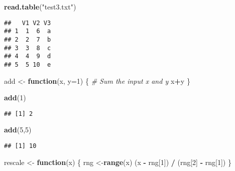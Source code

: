 \documentclass[]{article}
\newenvironment{Shaded}{\begin{snugshade}}{\end{snugshade}}
\newcommand{\KeywordTok}[1]{\textcolor[rgb]{0.13,0.29,0.53}{\textbf{#1}}}
\newcommand{\DataTypeTok}[1]{\textcolor[rgb]{0.13,0.29,0.53}{#1}}
\newcommand{\DecValTok}[1]{\textcolor[rgb]{0.00,0.00,0.81}{#1}}
\newcommand{\StringTok}[1]{\textcolor[rgb]{0.31,0.60,0.02}{#1}}
\newcommand{\CommentTok}[1]{\textcolor[rgb]{0.56,0.35,0.01}{\textit{#1}}}
\newcommand{\ControlFlowTok}[1]{\textcolor[rgb]{0.13,0.29,0.53}{\textbf{#1}}}
\newcommand{\OperatorTok}[1]{\textcolor[rgb]{0.81,0.36,0.00}{\textbf{#1}}}
\newcommand{\NormalTok}[1]{#1}
\begin{document}
\begin{Shaded}
\begin{Highlighting}[]
\KeywordTok{read.table}\NormalTok{(}\StringTok{"test3.txt"}\NormalTok{)}
\end{Highlighting}
\end{Shaded}

\begin{verbatim}
##   V1 V2 V3
## 1  1  6  a
## 2  2  7  b
## 3  3  8  c
## 4  4  9  d
## 5  5 10  e
\end{verbatim}

\begin{Shaded}
\begin{Highlighting}[]
\NormalTok{add <-}\StringTok{ }\ControlFlowTok{function}\NormalTok{(x, }\DataTypeTok{y=}\DecValTok{1}\NormalTok{) \{}
\CommentTok{# Sum the input x and y }
\NormalTok{  x}\OperatorTok{+}\NormalTok{y}
\NormalTok{\}}
\end{Highlighting}
\end{Shaded}

\begin{Shaded}
\begin{Highlighting}[]
\KeywordTok{add}\NormalTok{(}\DecValTok{1}\NormalTok{)}
\end{Highlighting}
\end{Shaded}

\begin{verbatim}
## [1] 2
\end{verbatim}

\begin{Shaded}
\begin{Highlighting}[]
\KeywordTok{add}\NormalTok{(}\DecValTok{5}\NormalTok{,}\DecValTok{5}\NormalTok{)}
\end{Highlighting}
\end{Shaded}

\begin{verbatim}
## [1] 10
\end{verbatim}

\begin{Shaded}
\begin{Highlighting}[]
\NormalTok{rescale <-}\StringTok{ }\ControlFlowTok{function}\NormalTok{(x) \{}
\NormalTok{   rng <-}\KeywordTok{range}\NormalTok{(x)}
\NormalTok{   (x }\OperatorTok{-}\StringTok{ }\NormalTok{rng[}\DecValTok{1}\NormalTok{]) }\OperatorTok{/}\StringTok{ }\NormalTok{(rng[}\DecValTok{2}\NormalTok{] }\OperatorTok{-}\StringTok{ }\NormalTok{rng[}\DecValTok{1}\NormalTok{])}
\NormalTok{\}}
\end{Highlighting}
\end{Shaded}
\end{document}
